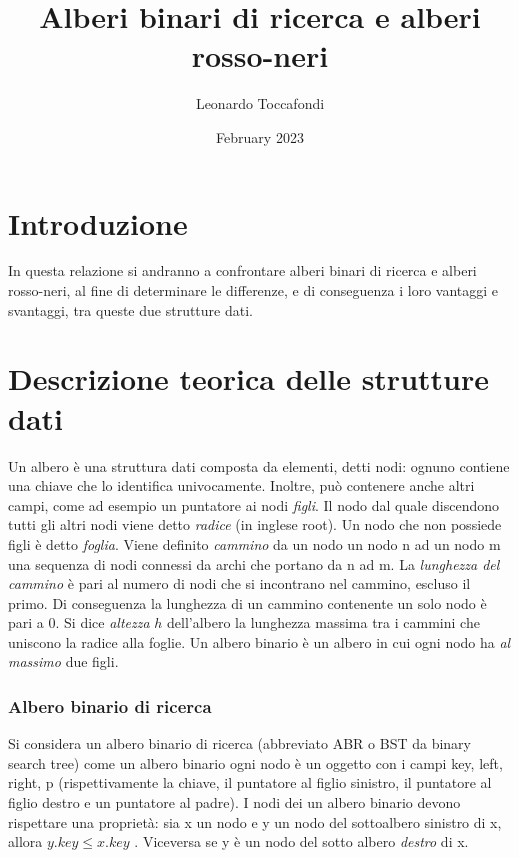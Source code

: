 \documentclass[
]{article}
\title{Alberi binari di ricerca e alberi rosso-neri}
\author{Leonardo Toccafondi}
\date{February 2023}
\begin{document}
\maketitle

\hypertarget{introduzione}{%
\section{Introduzione}\label{introduzione}}

In questa relazione si andranno a confrontare alberi binari di ricerca e
alberi rosso-neri, al fine di determinare le differenze, e di
conseguenza i loro vantaggi e svantaggi, tra queste due strutture dati.

\hypertarget{descrizione-teorica-delle-strutture-dati}{%
\section{Descrizione teorica delle strutture
dati}\label{descrizione-teorica-delle-strutture-dati}}

Un albero è una struttura dati composta da elementi, detti nodi: ognuno
contiene una chiave che lo identifica univocamente. Inoltre, può
contenere anche altri campi, come ad esempio un puntatore ai nodi
\emph{figli}. Il nodo dal quale discendono tutti gli altri nodi viene
detto \emph{radice} (in inglese root). Un nodo che non possiede figli è
detto \emph{foglia}. Viene definito \emph{cammino} da un nodo un nodo n
ad un nodo m una sequenza di nodi connessi da archi che portano da n ad
m. La \emph{lunghezza del cammino} è pari al numero di nodi che si
incontrano nel cammino, escluso il primo. Di conseguenza la lunghezza di
un cammino contenente un solo nodo è pari a 0. Si dice \emph{altezza}
\(h\) dell'albero la lunghezza massima tra i cammini che uniscono la
radice alla foglie. Un albero binario è un albero in cui ogni nodo ha
\emph{al massimo} due figli.

\hypertarget{albero-binario-di-ricerca}{%
\subsubsection{Albero binario di
ricerca}\label{albero-binario-di-ricerca}}

Si considera un albero binario di ricerca (abbreviato ABR o BST da
binary search tree) come un albero binario ogni nodo è un oggetto con i
campi key, left, right, p (rispettivamente la chiave, il puntatore al
figlio sinistro, il puntatore al figlio destro e un puntatore al padre).
I nodi dei un albero binario devono rispettare una proprietà: sia x un
nodo e y un nodo del sottoalbero sinistro di x, allora
\(y.key \leq x.key\) . Viceversa se y è un nodo del sotto albero
\emph{destro} di x.
\end{document}
